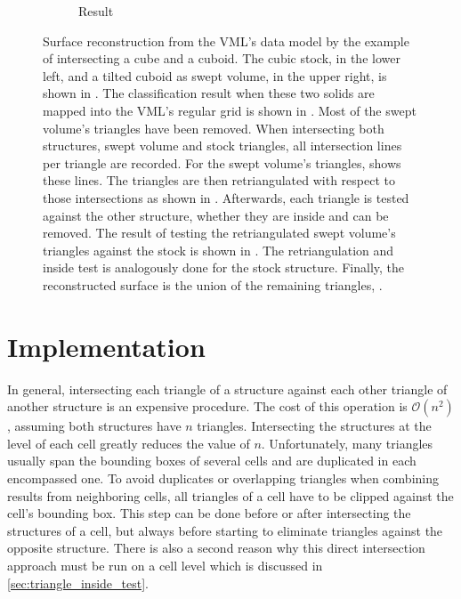 \begin{figure}
\begin{subfigure}[t]{0.3\textwidth}
		\caption{Result}
		\label{fig:cube2_result}
	\end{subfigure}
	\caption{
		Surface reconstruction from the VML's data model by the example of intersecting a cube and a cuboid.
		The cubic stock, in the lower left, and a tilted cuboid as swept volume, in the upper right, is shown in .
		The classification result when these two solids are mapped into the VML's regular grid is shown in .
		Most of the swept volume's triangles have been removed.
		When intersecting both structures, \ie swept volume and stock triangles, all intersection lines per triangle are recorded.
		For the swept volume's triangles,  shows these lines.
		The triangles are then retriangulated with respect to those intersections as shown in .
		Afterwards, each triangle is tested against the other structure, whether they are inside and can be removed.
		The result of testing the retriangulated swept volume's triangles against the stock is shown in .
		The retriangulation and inside test is analogously done for the stock structure.
		Finally, the reconstructed surface is the union of the remaining triangles, \cf {}.
	}
	\label{fig:cube2}
\end{figure}


\section{Implementation}
\label{sec:direct_intersection_implementation}

In general, intersecting each triangle of a structure against each other triangle of another structure is an expensive procedure.
The cost of this operation is $\mathcal{O}(n^2)$, assuming both structures have $n$ triangles.
Intersecting the structures at the level of each cell greatly reduces the value of $n$.
Unfortunately, many triangles usually span the bounding boxes of several cells and are duplicated in each encompassed one.
To avoid duplicates or overlapping triangles when combining results from neighboring cells, all triangles of a cell have to be clipped against the cell's bounding box.
This step can be done before or after intersecting the structures of a cell, but always before starting to eliminate triangles against the opposite structure.
There is also a second reason why this direct intersection approach must be run on a cell level which is discussed in \cref{sec:triangle_inside_test}.

